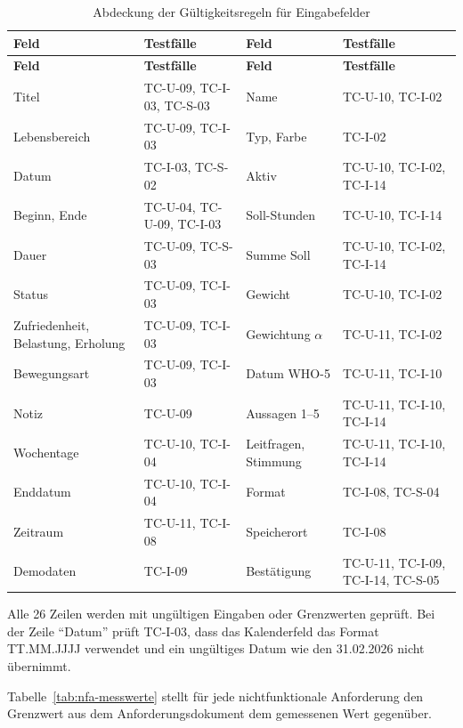 \begin{longtable}{@{}L{3.5cm}L{4.3cm}L{3.5cm}L{4.3cm}@{}}
  \caption{Abdeckung der Gültigkeitsregeln für Eingabefelder}\label{tab:validierungsabdeckung}\\
  \toprule
  \textbf{Feld} & \textbf{Testfälle} & \textbf{Feld} & \textbf{Testfälle} \\
  \midrule
  \endfirsthead
  \toprule
  \textbf{Feld} & \textbf{Testfälle} & \textbf{Feld} & \textbf{Testfälle} \\
  \midrule
  \endhead
  \bottomrule
  \endfoot
  Titel & TC-U-09, TC-I-03, TC-S-03 & Name & TC-U-10, TC-I-02 \\
  Lebensbereich & TC-U-09, TC-I-03 & Typ, Farbe & TC-I-02 \\
  Datum & TC-I-03, TC-S-02 & Aktiv & TC-U-10, TC-I-02, TC-I-14 \\
  Beginn, Ende & TC-U-04, TC-U-09, TC-I-03 & Soll-Stunden & TC-U-10, TC-I-14 \\
  Dauer & TC-U-09, TC-S-03 & Summe Soll & TC-U-10, TC-I-02, TC-I-14 \\
  Status & TC-U-09, TC-I-03 & Gewicht & TC-U-10, TC-I-02 \\
  Zufriedenheit, Belastung, Erholung & TC-U-09, TC-I-03 & Gewichtung $\alpha$ & TC-U-11, TC-I-02 \\
  Bewegungsart & TC-U-09, TC-I-03 & Datum WHO-5 & TC-U-11, TC-I-10 \\
  Notiz & TC-U-09 & Aussagen 1--5 & TC-U-11, TC-I-10, TC-I-14 \\
  Wochentage & TC-U-10, TC-I-04 & Leitfragen, Stimmung & TC-U-11, TC-I-10, TC-I-14 \\
  Enddatum & TC-U-10, TC-I-04 & Format & TC-I-08, TC-S-04 \\
  Zeitraum & TC-U-11, TC-I-08 & Speicherort & TC-I-08 \\
  Demodaten & TC-I-09 & Bestätigung & TC-U-11, TC-I-09, TC-I-14, TC-S-05 \\
\end{longtable}

Alle 26 Zeilen werden mit ungültigen Eingaben oder Grenzwerten geprüft. Bei der Zeile \enquote{Datum} prüft TC-I-03, dass das Kalenderfeld das Format TT.MM.JJJJ verwendet und ein ungültiges Datum wie den 31.02.2026 nicht übernimmt.

Tabelle~\ref{tab:nfa-messwerte} stellt für jede nichtfunktionale Anforderung den Grenzwert aus dem Anforderungsdokument dem gemessenen Wert gegenüber.

